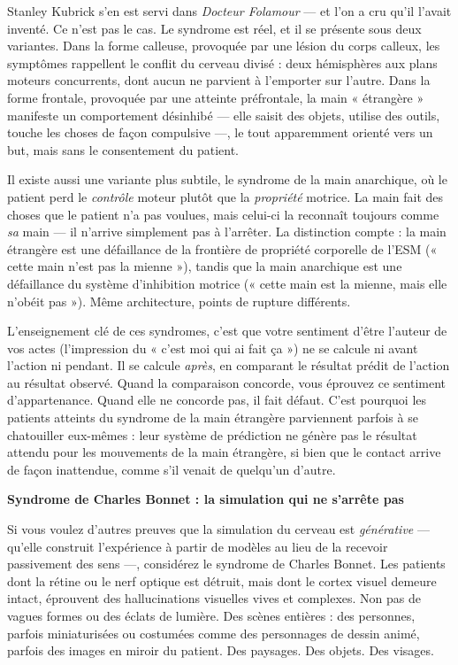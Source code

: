 \documentclass[11pt, twoside, openright]{book}
\begin{document}
Stanley Kubrick s'en est servi dans \textit{Docteur Folamour} --- et l'on a cru qu'il l'avait inventé. Ce n'est pas le cas. Le syndrome est réel, et il se présente sous deux variantes. Dans la forme calleuse, provoquée par une lésion du corps calleux, les symptômes rappellent le conflit du cerveau divisé : deux hémisphères aux plans moteurs concurrents, dont aucun ne parvient à l'emporter sur l'autre. Dans la forme frontale, provoquée par une atteinte préfrontale, la main « étrangère » manifeste un comportement désinhibé --- elle saisit des objets, utilise des outils, touche les choses de façon compulsive ---, le tout apparemment orienté vers un but, mais sans le consentement du patient.

Il existe aussi une variante plus subtile, le syndrome de la main anarchique, où le patient perd le \textit{contrôle} moteur plutôt que la \textit{propriété} motrice. La main fait des choses que le patient n'a pas voulues, mais celui-ci la reconnaît toujours comme \textit{sa} main --- il n'arrive simplement pas à l'arrêter. La distinction compte : la main étrangère est une défaillance de la frontière de propriété corporelle de l'ESM (« cette main n'est pas la mienne »), tandis que la main anarchique est une défaillance du système d'inhibition motrice (« cette main est la mienne, mais elle n'obéit pas »). Même architecture, points de rupture différents.

L'enseignement clé de ces syndromes, c'est que votre sentiment d'être l'auteur de vos actes (l'impression du « c'est moi qui ai fait ça ») ne se calcule ni avant l'action ni pendant. Il se calcule \textit{après}, en comparant le résultat prédit de l'action au résultat observé. Quand la comparaison concorde, vous éprouvez ce sentiment d'appartenance. Quand elle ne concorde pas, il fait défaut. C'est pourquoi les patients atteints du syndrome de la main étrangère parviennent parfois à se chatouiller eux-mêmes : leur système de prédiction ne génère pas le résultat attendu pour les mouvements de la main étrangère, si bien que le contact arrive de façon inattendue, comme s'il venait de quelqu'un d'autre.

\textbf{Syndrome de Charles Bonnet : la simulation qui ne s'arrête pas}

Si vous voulez d'autres preuves que la simulation du cerveau est \textit{générative} --- qu'elle construit l'expérience à partir de modèles au lieu de la recevoir passivement des sens ---, considérez le syndrome de Charles Bonnet. Les patients dont la rétine ou le nerf optique est détruit, mais dont le cortex visuel demeure intact, éprouvent des hallucinations visuelles vives et complexes. Non pas de vagues formes ou des éclats de lumière. Des scènes entières : des personnes, parfois miniaturisées ou costumées comme des personnages de dessin animé, parfois des images en miroir du patient. Des paysages. Des objets. Des visages.
\end{document}
